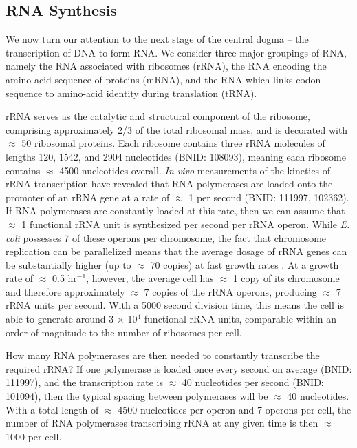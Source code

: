 \subsection{RNA Synthesis}\label{sec:RNA_synthesis}
We now turn our attention to the next stage of the central dogma -- the
transcription of DNA to form RNA. We consider three major groupings
of RNA, namely the RNA associated with ribosomes (rRNA), the RNA encoding the
amino-acid sequence of proteins (mRNA), and the RNA which links codon
sequence to amino-acid identity during translation (tRNA).


rRNA serves as the catalytic and structural component of the ribosome,
comprising approximately 2/3 of the total ribosomal mass, and is decorated
with $\approx$ 50 ribosomal proteins. Each ribosome contains three rRNA
molecules of lengths 120, 1542, and 2904 nucleotides (BNID: 108093), meaning
each ribosome contains $\approx$ 4500 nucleotides overall. \textit{In vivo}
measurements of the kinetics of rRNA transcription have revealed that RNA
polymerases are loaded onto the promoter of an rRNA gene at a rate of
$\approx$ 1 per second (BNID: 111997, 102362). If RNA polymerases are
constantly loaded at this rate, then we can assume that $\approx$ 1
functional rRNA unit is synthesized per second per rRNA operon. While
\textit{E. coli} possesses 7 of these operons per chromosome, the fact that
chromosome replication can be parallelized means that the average dosage of
rRNA genes can be substantially higher (up to $\approx$ 70 copies) at fast
growth rates \citep{dennis2004}. At a growth rate of $\approx$ 0.5 hr$^{-1}$, however, the
average cell has $\approx$ 1 copy of its chromosome and therefore
approximately $\approx$ 7 copies of the rRNA operons, producing
$\approx$ 7 rRNA units per second. With a 5000 second division time, this
means the cell is able to generate around 3 $\times$ 10$^4$ functional rRNA
units, comparable within an order of magnitude to the number of ribosomes per
cell.

How many RNA polymerases are then needed to constantly transcribe the required
rRNA? If one polymerase is loaded once every second on average (BNID: 111997),
and the transcription rate is $\approx$ 40 nucleotides per second (BNID:
101094), then the typical spacing between polymerases will be $\approx$ 40
nucleotides. With a total length of $\approx$ 4500 nucleotides per operon and 7
operons per cell, the number of RNA polymerases transcribing rRNA at any given
time is then $\approx$ 1000 per cell.

